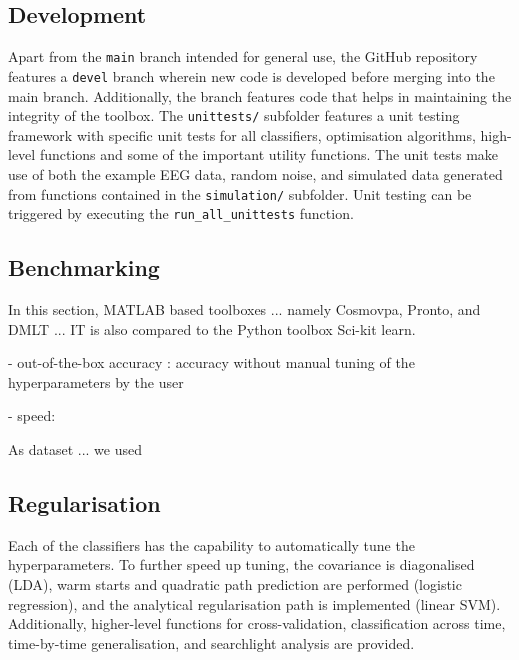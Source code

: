 \documentclass[utf8]{frontiersSCNS} %
\newcommand{\ttt}[1]{\texttt{#1}}
\begin{document}
\subsection{Development}\label{sec:development}

Apart from the \ttt{main} branch intended for general use, the GitHub repository features a \ttt{devel} branch wherein new code is developed before merging into the main branch. Additionally, the branch features code that helps in maintaining the integrity of the toolbox. The \ttt{unittests/} subfolder features a unit testing framework with specific unit tests for all classifiers, optimisation algorithms, high-level functions and some of the important utility functions. The unit tests make use of both the example EEG data, random noise, and simulated data generated from functions contained in the \ttt{simulation/} subfolder. Unit testing can be triggered by executing the \ttt{run\_all\_unittests} function.

\subsection{Benchmarking}\label{sec:benchmarking}

In this section,
MATLAB based toolboxes ...
namely Cosmovpa, Pronto, and DMLT ... IT is also compared to the Python toolbox Sci-kit learn.

- out-of-the-box accuracy : accuracy without manual tuning of the hyperparameters by the user

- speed:

As dataset ... we used



\subsection{Regularisation}

Each of the classifiers has the capability to automatically tune the hyperparameters. To further speed up tuning, the covariance is diagonalised (LDA), warm starts and quadratic path prediction are performed (logistic regression), and the analytical regularisation path is implemented (linear SVM). Additionally, higher-level functions for cross-validation, classification across time, time-by-time generalisation, and searchlight analysis are provided.
\end{document}
